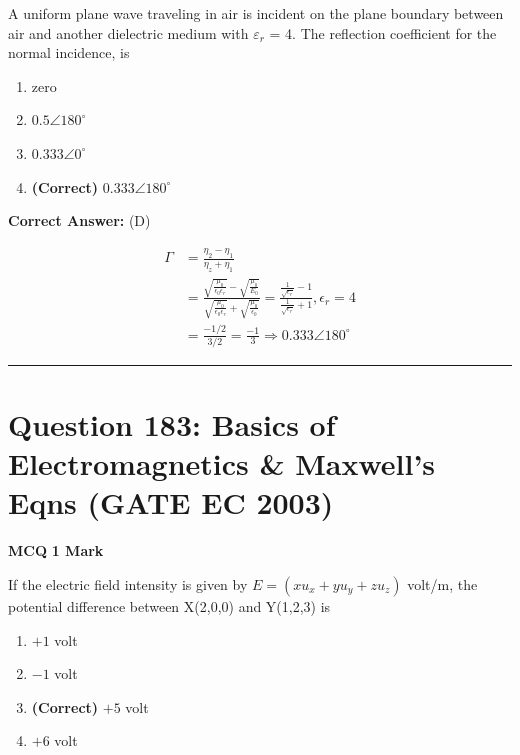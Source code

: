 \documentclass[11pt,a4paper]{article}
\begin{document}
\noindent A uniform plane wave traveling in air is incident on the plane boundary between air and another dielectric medium with $\varepsilon _{r}$ = 4. The reflection coefficient for the normal incidence, is


\begin{enumerate}[label=(\Alph*)]
    \item zero
    \item $0.5\angle 180^{\circ}$
    \item $0.333\angle 0^{\circ}$
    \item \textbf{(Correct)} $0.333\angle 180^{\circ}$
\end{enumerate}

\noindent \textbf{Correct Answer:} (D)

\begin{tcolorbox}[solbox, title=Detailed Solution -- Question 182]
\[
\begin{aligned} \Gamma &=\frac{\eta_{2}-\eta_{1}}{\eta_{z}+\eta_{1}} \\ &=\frac{\sqrt{\frac{\mu_{0}}{\epsilon_{0} \epsilon_{r}}}-\sqrt{\frac{\mu_{0}}{E_{0}}}}{\sqrt{\frac{\mu_{0}}{\epsilon_{0} \epsilon_{r}}}+\sqrt{\frac{\mu_{0}}{\epsilon_{0}}}}=\frac{\frac{1}{\sqrt{\epsilon_{r}}}-1}{\frac{1}{\sqrt{\epsilon_{r}}}+1},\epsilon_{r}=4\\ &=\frac{-1 / 2}{3 / 2}=\frac{-1}{3} \Rightarrow 0.333 \angle 180^{\circ} \end{aligned}
\]
\end{tcolorbox}

\vspace{1.5em}
\hrule
\vspace{1.5em}

\section*{Question 183: Basics of Electromagnetics \& Maxwell's Eqns (GATE EC 2003)}
\noindent \textbf{\color{primary}MCQ} \hfill \textbf{\color{secondary}1 Mark}


\noindent If the electric field intensity is given by $E = (xu_{x}+yu_{y}+zu_{z})$ volt/m, the potential difference between X(2,0,0) and Y(1,2,3) is


\begin{enumerate}[label=(\Alph*)]
    \item $+1$ volt
    \item $-1$ volt
    \item \textbf{(Correct)} $+5$ volt
    \item $+6$ volt
\end{enumerate}
\end{document}
